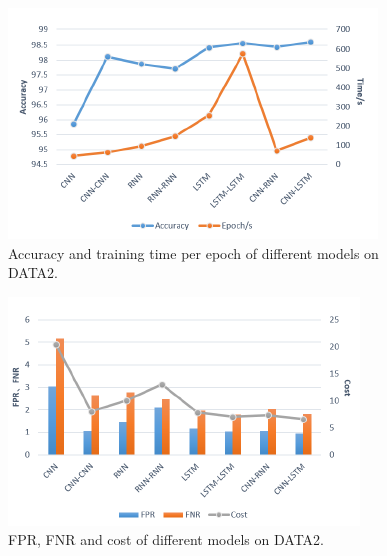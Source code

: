 \documentclass{ieeeaccess}
\begin{document}
\begin{figure}
    \centering
    \includegraphics[width=\linewidth]{figure10.png}
    \caption{Accuracy and training time per epoch of different models on
DATA2.}
    \label{fig:10}
\end{figure}

\begin{figure}
    \centering
    \includegraphics[width=\linewidth]{figure11.png}
    \caption{FPR, FNR and cost of different models on DATA2.}
    \label{fig:11}
\end{figure}
\end{document}
